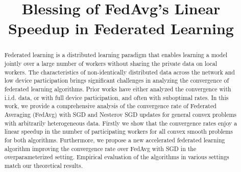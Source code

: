 \documentclass{article}
\title{Blessing of FedAvg's Linear Speedup in Federated Learning}
\author{}
\begin{document}
\maketitle

\begin{abstract}
Federated learning is a distributed learning paradigm that enables learning a
model jointly over a large number of workers without sharing the private data
on local workers. The characteristics of non-identically distributed data
across the network and low device participation brings significant challenges
in analyzing the convergence of federated learning algorithms. Prior works
have either analyzed the convergence with i.i.d. data, or with full device
participation, and often with suboptimal rates. In this work, we provide a
comprehensive analysis of the convergence rate of Federated Averaging (FedAvg)
with SGD and Nesterov SGD updates for general convex problems with arbitrarily
heterogeneous data. Firstly we show that the convergence rates enjoy a linear
speedup in the number of participating workers for all convex smooth problems
for both algorithms. Furthermore, we propose a new accelerated federated
learning algorithm improving the convergence rate over FedAvg with SGD in the
overparameterized setting. Empirical evaluation of the algorithms in various
settings match our theoretical results.
\end{abstract}










\newpage
\appendix

% 




\small


\end{document}
